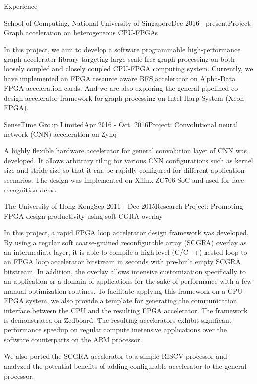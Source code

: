 \documentclass{resume} %
\begin{document}
\begin{rSection}{Experience}
\begin{rSubsection}{School of Computing, National University of Singapore}{Dec
    2016 - present}{Project: Graph acceleration on heterogeneous CPU-FPGAs}{}
\item In this project, we aim to develop a software programmable high-performance graph 
    accelerator library targeting large scale-free graph processing on both loosely coupled 
    and closely coupled CPU-FPGA computing system. Currently, we have implemented an FPGA 
    resource aware BFS accelerator 
    on Alpha-Data FPGA acceleration cards. And we are also exploring the 
	general pipelined co-design accelerator framework for graph processing 
	on Intel Harp System (Xeon-FPGA). 
\end{rSubsection}

\begin{rSubsection}{SenseTime Group Limited}{Apr 2016 - Oct. 2016}{Project: Convolutional neural network
    (CNN) acceleration on Zynq}{}
\item A highly flexible hardware accelerator for general convolution layer 
    of CNN was developed. It allows arbitrary tiling for various CNN configurations 
    such as kernel size and stride size so that it can be rapidly configured for different 
    application scenarios. The design was implemented on Xilinx ZC706 SoC and used 
    for face recognition demo.
\end{rSubsection}

\begin{rSubsection}{The University of Hong Kong}{Sep 2011 - Dec 2015}{Research Project: Promoting FPGA design productivity using soft CGRA overlay}{}
\item In this project, a rapid FPGA loop accelerator design framework was developed. By using a
    regular soft coarse-grained reconfigurable array (SCGRA) overlay as an intermediate layer, it is
    able to compile a high-level (C/C++) nested loop to an FPGA loop accelerator bitstream in
    seconds with pre-built empty SCGRA bitstream. In addition, the overlay allows intensive customization 
    specifically to an application or a domain of applications for the sake of performance with 
    a few manual optimization routines. To facilitate applying this framework on a CPU-FPGA system,
    we also provide a template for generating the communication interface between the CPU and 
    the resulting FPGA accelerator. The framework is demonstrated on Zedboard. The resulting 
    accelerators exhibit significant performance speedup on regular 
    compute inetensive applications over the software counterparts on the ARM processor. 
\\
\item We also ported the SCGRA accelerator to a simple RISCV processor 
    and analyzed the potential benefits of adding configurable accelerator 
    to the general processor.
\end{rSubsection}


\end{rSection}
\end{document}
